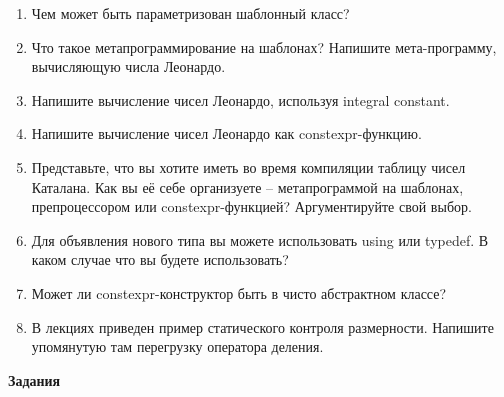 \documentclass[a4paper,12pt,oneside]{article}
\begin{document}
\begin{enumerate}
\item Чем может быть параметризован шаблонный класс?
\item Что такое метапрограммирование на шаблонах? Напишите мета-программу, вычисляющую числа Леонардо.
\item Напишите вычисление чисел Леонардо, используя integral constant.
\item Напишите вычисление чисел Леонардо как constexpr-функцию.
\item Представьте, что вы хотите иметь во время компиляции таблицу чисел Каталана. Как вы её себе организуете -- метапрограммой на шаблонах, препроцессором или constexpr-функцией? Аргументируйте свой выбор.
\item Для объявления нового типа вы можете использовать using или typedef. В каком случае что вы будете использовать?
\item Может ли constexpr-конструктор быть в чисто абстрактном классе?
\item В лекциях приведен пример статического контроля размерности. Напишите упомянутую там перегрузку оператора деления.
\end{enumerate}

\textbf{Задания}
\end{document}
